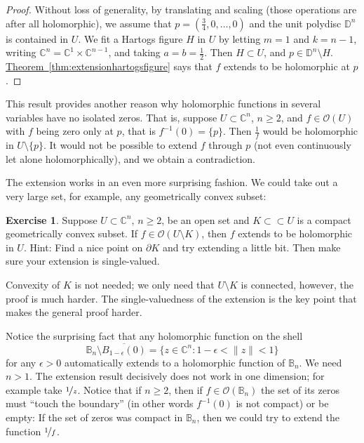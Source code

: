 \documentclass[12pt,openany]{book}
\newcommand{\snorm}[1]{\lVert {#1} \rVert}
\newcommand{\C}{{\mathbb{C}}}
\newcommand{\D}{{\mathbb{D}}}
\newcommand{\bB}{{\mathbb{B}}}
\newcommand{\sO}{{\mathscr{O}}}
\theoremstyle{plain}
\theoremstyle{remark}
\theoremstyle{definition}
\newenvironment{exbox}{%
    \def\FrameCommand{\vrule width 1pt \relax\hspace {10pt}}%
    \MakeFramed {\advance \hsize -\width \FrameRestore }%
}{%
    \endMakeFramed
}
\theoremstyle{exercise}
\newtheorem{exercise}{Exercise}[section]
\theoremstyle{example}
\newcommand{\thmref}[1]{\hyperref[#1]{Theorem~\ref*{#1}}}
\begin{document}
\begin{proof}
Without loss of generality,
by translating and scaling (those operations are after all holomorphic),
we assume that $p = (\frac{3}{4},0,\ldots,0)$
and the unit polydisc $\D^n$ is contained in $U$.  We fit a Hartogs figure $H$
in $U$
by letting $m=1$ and $k=n-1$, writing $\C^n = \C^{1} \times \C^{n-1}$,
and taking $a = b = \frac{1}{2}$.
Then $H \subset U$, and $p \in \D^n \setminus H$.
\thmref{thm:extensionhartogsfigure} says that
$f$ extends to be holomorphic at $p$.
\end{proof}

This result provides another reason why holomorphic functions in several
variables have no isolated zeros.  That is, suppose $U \subset \C^n$,
$n \geq 2$, and $f \in \sO(U)$ with $f$ being zero only at $p$, that
is $f^{-1}(0) = \{ p \}$.  Then $\frac{1}{f}$ would be holomorphic in
$U \setminus \{ p \}$.  It would not be possible to extend $f$
through $p$ (not even continuously let alone holomorphically),
and we obtain a contradiction.

The extension works in an even more surprising fashion.  We could
take out a very large set, for example, any geometrically
convex subset:

\begin{exbox}
\begin{exercise} \label{exercise:convexhartogs}
Suppose $U \subset \C^n$, $n \geq 2$, be an open set and $K \subset \subset U$
is a compact geometrically
convex subset.
If $f \in \sO(U \setminus K)$,
then $f$ extends to be holomorphic in $U$.
Hint: Find a nice point on $\partial K$ and try extending a little bit.
Then make sure your extension is single-valued.
\end{exercise}
\end{exbox}

Convexity of $K$ is not needed; we only need that $U\setminus K$
is connected, however, the proof is much harder.
The single-valuedness of the extension is the key point that makes the
general proof harder.

Notice the surprising fact that any holomorphic function on
the shell
\begin{equation*}
\bB_n \setminus \overline{B_{1-\epsilon}(0)} =
\bigl\{ z \in \C^n : 1-\epsilon < \snorm{z} < 1 \bigr\}
\end{equation*}
for any $\epsilon > 0$ automatically
extends to a holomorphic function of $\bB_n$.  We need $n > 1$.
The extension result decisively does not work in one dimension; for
example take $\nicefrac{1}{z}$.
Notice that if $n \geq 2$, then if $f \in \sO(\bB_n)$
the set of its zeros must 
``touch the boundary'' (in other words $f^{-1}(0)$ is not compact)
or be empty:  If the set of zeros was 
compact in $\bB_n$, then we could try to
extend the function $\nicefrac{1}{f}$.
\end{document}
